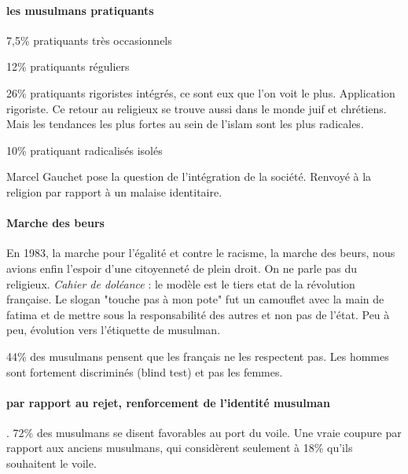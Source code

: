 \paragraph{les musulmans pratiquants}
\bi
\item 7,5\% pratiquants très occasionnels
\item 12\% pratiquants réguliers
\item 26\% pratiquants rigoristes intégrés, ce sont eux que l'on voit le plus. Application rigoriste. Ce retour au religieux se trouve aussi dans le monde juif et chrétiens. Mais les tendances les plus fortes au sein de l'islam sont les plus radicales.
\item 10\% pratiquant radicalisés isolés
\ei

Marcel Gauchet pose la question de l'intégration de la société. Renvoyé à la religion par rapport à un malaise identitaire.

\paragraph{Marche des beurs} En 1983, la marche pour l'égalité et contre le racisme, la marche des beurs, nous avions enfin l'espoir d'une citoyenneté de plein droit. On ne parle pas du religieux. \emph{Cahier de doléance} : le modèle est le tiers etat de la révolution française. Le slogan "touche pas à mon pote" fut un camouflet avec la main de fatima et de mettre sous la responsabilité des autres et non pas de l'état.
Peu à peu, évolution vers l'étiquette de musulman. 

44\% des musulmans pensent que les français ne les respectent pas.
Les hommes sont fortement discriminés (blind test) et pas les femmes.

\paragraph{par rapport au rejet, renforcement de l'identité musulman}. 72\% des musulmans se disent favorables au port du voile. Une vraie coupure par rapport aux anciens musulmans, qui considèrent seulement à 18\% qu'ils souhaitent le voile.

